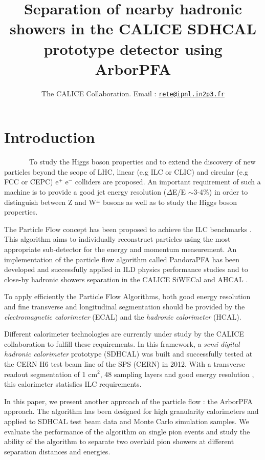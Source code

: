\documentclass[cits]{JINST}
\title{Separation of nearby hadronic showers in the CALICE SDHCAL prototype detector using ArborPFA}
\author{The CALICE Collaboration. Email : \href{mailto:rete@ipnl.in2p3.fr}{\tt rete@ipnl.in2p3.fr}}
\begin{document}

\newpage
\section{Introduction}

~~~~~~~To study the Higgs boson properties and to extend the discovery of new particles beyond the scope of LHC, linear (e.g ILC or CLIC) and circular (e.g FCC or CEPC) e$^+$ e$^-$ colliders are proposed. An important requirement of such a machine is to provide a good jet energy resolution ($\Delta$E/E $\sim$3-4\%) in order to distinguish between Z and W$^{\pm}$ bosons as well as to study the Higgs boson properties.

The Particle Flow concept has been proposed to achieve the ILC benchmarks \cite{ilc-tdr}. This algorithm aims to individually reconstruct particles using the most appropriate sub-detector for the energy and momentum measurement. An implementation of the particle flow algorithm called PandoraPFA has been developed \cite{pandora-pfa} and successfully applied in ILD physics performance studies and to close-by hadronic showers separation in the CALICE SiWECal and AHCAL \cite{calice-pandora-paper}.

To apply efficiently the Particle Flow Algorithms, both good energy resolution and fine transverse and longitudinal segmentation should be provided by the \textit{electromagnetic calorimeter} (ECAL) and the \textit{hadronic calorimeter} (HCAL).

Different calorimeter technologies are currently under study by the CALICE collaboration to fulfill these requirements. In this framework, a \textit{semi digital hadronic calorimeter} prototype (SDHCAL) was built \cite{sdhcal-paper} and successfully tested at the CERN H6 test beam line of the SPS (CERN) in 2012. With a transverse readout segmentation of 1 cm$^2$, 48 sampling layers and good energy resolution \cite{sdhcal-paper}, this calorimeter statisfies ILC requirements. 

In this paper, we present another approach of the particle flow : the ArborPFA approach. The algorithm has been designed for high granularity calorimeters and applied to SDHCAL test beam data and Monte Carlo simulation samples. We evaluate the performance of the algorithm on single pion events and study the ability of the algorithm to separate two overlaid pion showers at different separation distances and energies.
\end{document}
